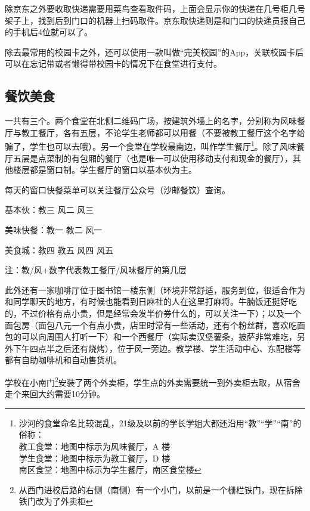 除京东之外要收取快递需要用菜鸟查看取件码，上面会显示你的快递在几号柜几号架子上，找到后到门口的机器上扫码取件。京东取快递则是和门口的快递员报自己的手机后4位就可以了。



除去最常用的校园卡之外，还可以使用一款叫做“完美校园”的App，关联校园卡后可以在忘记带或者懒得带校园卡的情况下在食堂进行支付。


\subsection{餐饮美食}


一共有三个。两个食堂在北侧二维码广场，按建筑外墙上的名字，分别称为风味餐厅与教工餐厅，各有五层，不论学生老师都可以用餐（不要被教工餐厅这个名字给骗了，学生也可以去哦）。另一个食堂在学校最南边，叫作学生餐厅\footnote{沙河的食堂命名比较混乱，21级及以前的学长学姐大都还沿用“教”“学”“南”的俗称：\\\hspace*{4em}教工食堂：地图中标示为风味餐厅，A 楼\\\hspace*{4em}学生食堂：地图中标示为教工餐厅，D 楼\\\hspace*{4em}南区食堂：地图中标示为学生餐厅，南区食堂楼}。除了风味餐厅五层是点菜制的有包厢的餐厅（也是唯一可以使用移动支付和现金的餐厅），其他楼层都是窗口制。学生餐厅的窗口以基本伙为主。

每天的窗口快餐菜单可以关注餐厅公众号（沙邮餐饮）查询。

基本伙：教三 风二 风三

美味快餐：教一 教二 风一

美食城：教四 教五 风四 风五

注：教/风+数字代表教工餐厅/风味餐厅的第几层

此外还有一家咖啡厅位于图书馆一楼东侧（环境非常舒适，服务到位，很适合作为和同学聊天的地方，有时候也能看到日麻社的人在这里打麻将。牛腩饭还挺好吃的，不过价格有点小贵，但是经常会发半价券什么的，可以关注一下）；以及一个面包房（面包八元一个有点小贵，店里时常有一些活动，还有个粉丝群，喜欢吃面包的可以向周围人打听一下）和一个西餐厅（实际卖汉堡薯条，披萨非常难吃，另外下午四点半之后还有烧烤），位于风一旁边。教学楼、学生活动中心、东配楼等都有自助咖啡机和自动售货机。


学校在小南门\footnote{从西门进校后路的右侧（南侧）有一个小门，以前是一个栅栏铁门，现在拆除铁门改为了外卖柜}安装了两个外卖柜，学生点的外卖需要统一到外卖柜去取，从宿舍走个来回大约需要10分钟。

